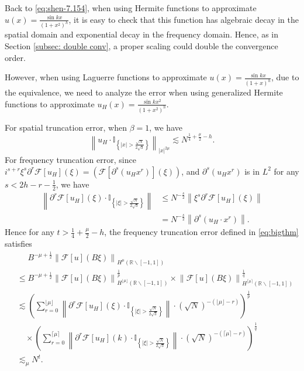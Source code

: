 \documentclass[pdflatex,sn-aps]{sn-jnl}%
\theoremstyle{thmstyleone}%
\theoremstyle{thmstyletwo}%
\theoremstyle{thmstylethree}%
\begin{document}
Back to \eqref{eq:shen-7.154}, when using Hermite functions to approximate $u(x)=\frac{\sin k x}{\left(1+x^2\right)^h}$, it is easy to check that this function has algebraic decay in the spatial domain and exponential decay in the frequency domain. Hence, as in Section \ref{subsec: double conv}, a proper
scaling could double the convergence order.

However, when using Laguerre functions to approximate $u(x)=\frac{\sin k x}{(1+x)^h}$,
due to the equivalence, we need to analyze the error when using
generalized Hermite functions to approximate $u_H(x) = \frac{\sin k x^2}{(1+x^2)^h}$.

For spatial truncation error, when $\beta = 1$, we have
\begin{equation}\label{eq:0629-5.5-1}
  \left\|u_H \cdot \mathbb{I}_{\left\{|x|>\frac{\sqrt{N}}{2 \sqrt{3}}\right\}}\right\|_{|x|^{2\mu}} \lesssim N^{\frac{1}{4}+\frac{\mu}{2}-h}.
\end{equation}
For frequency truncation error, since $i^{s+r} \xi^s \partial^r \mathcal{F}[u_H](\xi) = \left(\mathcal{F}[\partial^s (u_Hx^r)](\xi)\right)$,
and $\partial^s (u_Hx^r)$ is in  $L^2$ for any $s < 2h-r-\frac{1}{2}$, we have
\begin{equation}\label{eq:0629-5.5-2}
  \begin{aligned}
    \left\|\partial^r \mathcal{F}\left[u_H\right](\xi) \cdot \mathbb{I}_{\left\{|\xi|>\frac{\sqrt{N}}{2 \sqrt{3}} \right\}}\right\| & \leqslant N^{-\frac{s}{2}} \left\|\xi^s \partial^r \mathcal{F}\left[u_H\right](\xi) \right\| \\
    & = N^{-\frac{s}{2}} \left\|\partial^s (u_H \cdot x^r)\right\|.
  \end{aligned}
\end{equation}
Hence for any $t > \frac{1}{4} + \frac{\mu}{2} -h$, the frequency truncation error defined in \eqref{eq:bigthm} satisfies
\begin{equation}\label{eq:0629-5.5-3}
  \begin{aligned}
    & \,\,\quad B^{-\mu+\frac{1}{2}} \left\| \mathcal{F}[u]\left(B \xi\right) \right\|_{H^{\mu}\left(\mathbb{R}\backslash [-1,1]\right)} \\
    & \leqslant B^{-\mu+\frac{1}{2}} \left\| \mathcal{F}[u]\left(B \xi\right) \right\|_{H^{\lfloor\mu\rfloor}\left(\mathbb{R}\backslash [-1,1]\right)}^{\frac{1}{p}} \times \left\| \mathcal{F}[u]\left(B \xi\right) \right\|_{H^{\lceil\mu\rceil}\left(\mathbb{R}\backslash [-1,1]\right)}^{\frac{1}{q}} \\
    & \lesssim \left(\sum_{r=0}^{\lfloor\mu\rfloor}\left\|\partial^r \mathcal{F}\left[u_H\right](\xi) \cdot \mathbb{I}_{\left\{|\xi|>\frac{\sqrt{N}}{2 \sqrt{3}} \right\}}\right\| \cdot( \sqrt{N})^{-(\lfloor\mu\rfloor-r)}\right)^{\frac{1}{p}} \\
    &\quad \times\left(\sum_{r=0}^{\lceil\mu\rceil}\left\|\partial^r \mathcal{F}\left[u_H\right](k) \cdot \mathbb{I}_{\left\{|\xi|>\frac{\sqrt{N}}{2 \sqrt{3}} \right\}}\right\| \cdot(\sqrt{N})^{-(\lceil\mu\rceil-r)}\right)^{\frac{1}{q}} \\
    & \lesssim_\mu N^t.
  \end{aligned}
\end{equation}
\end{document}
